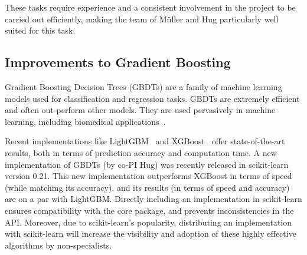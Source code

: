 \documentclass[11pt]{article}  %
\begin{document}
These tasks require experience and a consistent involvement in the project
to be carried out efficiently, making the team of M\"uller and Hug
particularly well suited for this task.

\subsection{Improvements to Gradient Boosting}

Gradient Boosting Decision Trees (GBDTs) are a family of machine learning
models used for classification and regression tasks. GBDTs are extremely
efficient and often out-perform other models. They are used pervasively in
machine learning, including biomedical applications~\cite{chen2019hiv, shah2019development}.

Recent implementations like LightGBM~\cite{LightGBM} and XGBoost~\cite{XGB}
offer state-of-the-art results, both in terms of prediction accuracy and
computation time.
A new implementation of GBDTs (by co-PI Hug) was recently
released in scikit-learn version 0.21. This new implementation
outperforms XGBoost in terms of speed (while matching its accuracy), and its results (in terms of speed and accuracy)
are on a par with LightGBM. Directly including an implementation in scikit-learn ensures compatibility with the core package, and prevents inconsistencies in the API. Moreover, due to scikit-learn's popularity, distributing an implementation with scikit-learn will increase the visibility and adoption of these highly effective algorithms by non-specialists.
\end{document}
